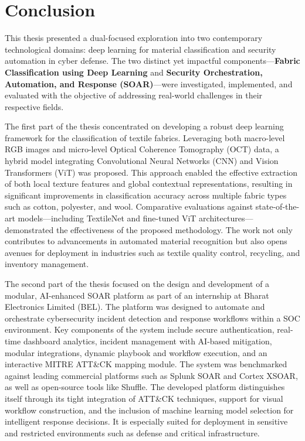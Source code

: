 \chapter{Conclusion}

This thesis presented a dual-focused exploration into two contemporary technological domains: deep learning for material classification and security automation in cyber defense. The two distinct yet impactful components—\textbf{Fabric Classification using Deep Learning} and \textbf{Security Orchestration, Automation, and Response (SOAR)}—were investigated, implemented, and evaluated with the objective of addressing real-world challenges in their respective fields.

The first part of the thesis concentrated on developing a robust deep learning framework for the classification of textile fabrics. Leveraging both macro-level RGB images and micro-level Optical Coherence Tomography (OCT) data, a hybrid model integrating Convolutional Neural Networks (CNN) and Vision Transformers (ViT) was proposed. This approach enabled the effective extraction of both local texture features and global contextual representations, resulting in significant improvements in classification accuracy across multiple fabric types such as cotton, polyester, and wool. Comparative evaluations against state-of-the-art models—including TextileNet and fine-tuned ViT architectures—demonstrated the effectiveness of the proposed methodology. The work not only contributes to advancements in automated material recognition but also opens avenues for deployment in industries such as textile quality control, recycling, and inventory management.

The second part of the thesis focused on the design and development of a modular, AI-enhanced SOAR platform as part of an internship at Bharat Electronics Limited (BEL). The platform was designed to automate and orchestrate cybersecurity incident detection and response workflows within a SOC environment. Key components of the system include secure authentication, real-time dashboard analytics, incident management with AI-based mitigation, modular integrations, dynamic playbook and workflow execution, and an interactive MITRE ATT\&CK mapping module. The system was benchmarked against leading commercial platforms such as Splunk SOAR and Cortex XSOAR, as well as open-source tools like Shuffle. The developed platform distinguishes itself through its tight integration of ATT\&CK techniques, support for visual workflow construction, and the inclusion of machine learning model selection for intelligent response decisions. It is especially suited for deployment in sensitive and restricted environments such as defense and critical infrastructure.

